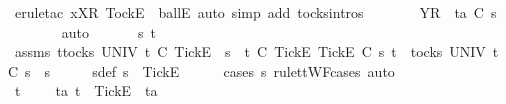 \begin{isabellebody}
\ {\isacharparenleft}erule{\isacharunderscore}tac\ x{\isacharequal}{\isachardoublequoteopen}{\isacharbrackleft}{\isacharbrackleft}X{\isacharbrackright}\isactrlsub R{\isacharcomma}\ {\isacharbrackleft}Tock{\isacharbrackright}\isactrlsub E{\isacharbrackright}{\isachardoublequoteclose}\ \ ballE{\isacharcomma}\ auto\ simp\ add{\isacharcolon}\ tocks{\isachardot}intros{\isacharparenright}\isanewline
\ \ \ \ \isamarkupfalse%
\ \isamarkupfalse%
\ {\isachardoublequoteopen}{\isacharbrackleft}Y{\isacharbrackright}\isactrlsub R\ {\isacharhash}\ ta\ {\isasymle}\isactrlsub C\ s{}{\isacharprime}{\isachardoublequoteclose}\isanewline
\ \ \ \ \ \ \isamarkupfalse%
\ auto\isanewline
\ \ \isamarkupfalse%
\isanewline
{}\isamarkupfalse%
\isanewline
\ \ \isamarkupfalse%
\ s{}{\isacharprime}\ t\isanewline
\ \ \isamarkupfalse%
\ assms{\isacharcolon}\ {\isachardoublequoteopen}{\isasymforall}t{\isasymin}tocks\ UNIV{\isachardot}\ t\ {\isasymle}\isactrlsub C\ {\isacharbrackleft}{\isacharbrackleft}Tick{\isacharbrackright}\isactrlsub E{\isacharbrackright}\ {\isacharat}\ s{}\ {\isasymlongrightarrow}\ t\ {\isasymle}\isactrlsub C\ {\isacharbrackleft}{\isacharbrackleft}Tick{\isacharbrackright}\isactrlsub E{\isacharbrackright}{\isachardoublequoteclose}\ {\isachardoublequoteopen}{\isacharbrackleft}{\isacharbrackleft}Tick{\isacharbrackright}\isactrlsub E{\isacharbrackright}\ {\isasymsubseteq}\isactrlsub C\ s{}{\isacharprime}{\isachardoublequoteclose}\ {\isachardoublequoteopen}t\ {\isasymin}\ tocks\ UNIV{\isachardoublequoteclose}\ {\isachardoublequoteopen}t\ {\isasymle}\isactrlsub C\ s{}{\isacharprime}\ {\isacharat}\ s{}{\isachardoublequoteclose}\isanewline
\ \ \isamarkupfalse%
\ \isamarkupfalse%
\ s{}{\isacharprime}{\isacharunderscore}def{\isacharcolon}\ {\isachardoublequoteopen}s{}{\isacharprime}\ {\isacharequal}\ {\isacharbrackleft}{\isacharbrackleft}Tick{\isacharbrackright}\isactrlsub E{\isacharbrackright}{\isachardoublequoteclose}\isanewline
\ \ \ \ \isamarkupfalse%
\ {\isacharparenleft}cases\ s{}{\isacharprime}\ rule{\isacharcolon}ttWF{\isachardot}cases{\isacharcomma}\ auto{\isacharparenright}\isanewline
\ \ \isamarkupfalse%
\ \isamarkupfalse%
\ {\isachardoublequoteopen}t\ {\isacharequal}\ {\isacharbrackleft}{\isacharbrackright}\ {\isasymor}\ {\isacharparenleft}{\isasymexists}\ ta{\isachardot}\ t\ {\isacharequal}\ {\isacharbrackleft}Tick{\isacharbrackright}\isactrlsub E\ {\isacharhash}\ ta{\isacharparenright}{\isachardoublequoteclose}\isanewline

\end{isabellebody}
